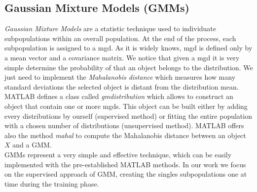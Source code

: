 \subsection{Gaussian Mixture Models (GMMs)}
\label{subsec:gmm}

\textit{Gaussian Mixture Models} are a statistic technique used to individuate subpopulations within an overall population. At the end of the process, each subpopulation is assigned to a \gls{mgd}.  As it is widely knows, \gls{mgd} is defined only by a mean vector and a covariance matrix. We notice that given a \gls{mgd} it is very simple determine the probability of that an object belongs to the distribution. We just need to implement the \textit{Mahalanobis distance} which measures how many standard deviations the selected object is distant from the distribution mean. \\
%
MATLAB defines a class called \textit{gmdistribution} which allows to construct an object that contain one or more \gls{mgd}s. This object can be built either by adding every distributions by ourself (supervised method) or fitting the entire population with a chosen number of distributions (unsupervised method). MATLAB offers also the method \textit{mahal} to compute the Mahalanobis distance between an object $X$ and a GMM. \\
%
GMMs represent a very simple and effective technique, which can be easily implemented with the pre-established MATLAB methods. In our work we focus on the supervised approach of GMM, creating the singles subpopulations one at time during the training phase.
